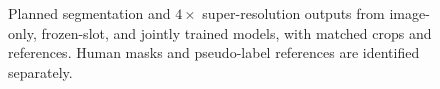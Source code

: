 \begin{figure}[tbp]
    \centering
    \caption{Planned segmentation and $4\times$ super-resolution outputs from image-only, frozen-slot, and jointly trained models, with matched crops and references. Human masks and pseudo-label references are identified separately.}
    \label{fig:candidate_spatial_outputs}
\end{figure}
